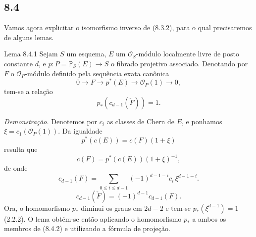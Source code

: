 \subsection*{8.4}

Vamos agora explicitar o isomorfismo inverso de (8.3.2), para o qual precisaremos de alguns lemas.

\begin{statement}{Lema 8.4.1}
Sejam $S$ um esquema, $E$ um $\mathcal O_S$-módulo localmente livre de posto constante $d$, e $p:P=\mathbb P_S(E)\to S$ o fibrado projetivo associado. Denotando por $F$ o $\mathcal O_P$-módulo definido pela sequência exata canônica
\[
0\to F\to p^*(E)\to\mathcal O_P(1)\to0,
\]
tem-se a relação
\[
p_*(c_{d-1}(\check F))=1.
\]
\end{statement}

\emph{Demonstração.} Denotemos por $c_i$ as classes de Chern de $E$, e ponhamos $\xi=c_1(\mathcal O_P(1))$. Da igualdade
\[
p^*(c(E))=c(F)(1+\xi)
\]
resulta que
\[
c(F)=p^*(c(E))(1+\xi)^{-1},
\]
de onde
\[
c_{d-1}(F)=\sum_{0\le i\le d-1}(-1)^{d-1-i}c_i\,\xi^{d-1-i}.
\tag{8.4.2}
\]
\[
c_{d-1}(\check F)=(-1)^{d-1}c_{d-1}(F).
\]
Ora, o homomorfismo $p_*$ diminui os graus em $2d-2$ e tem-se $p_*(\xi^{d-1})=1$ (2.2.2). O lema obtém-se então aplicando o homomorfismo $p_*$ a ambos os membros de (8.4.2) e utilizando a fórmula de projeção.
